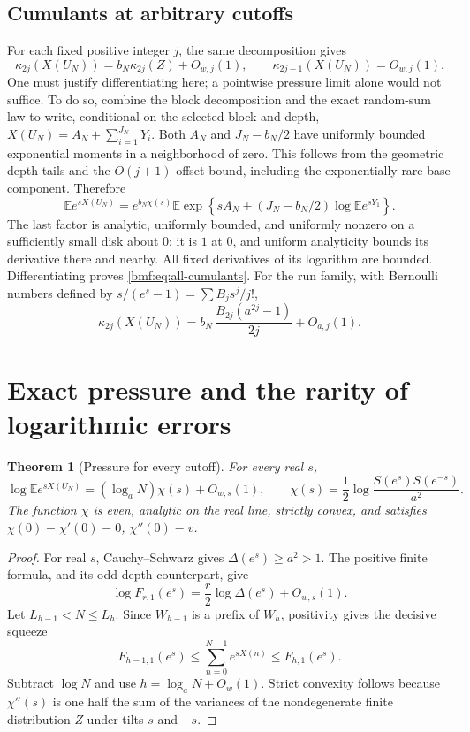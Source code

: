 \documentclass[11pt]{article}
\numberwithin{equation}{section}
\newtheorem{theorem}{Theorem}[section]
\theoremstyle{definition}
\theoremstyle{remark}
\newcommand{\E}{\mathbb E}
\begin{document}
\subsection{Cumulants at arbitrary cutoffs}

For each fixed positive integer $j$, the same decomposition gives
\begin{equation}\label{bmf:eq:all-cumulants}
 \kappa_{2j}(X(U_N))=b_N\kappa_{2j}(Z)+O_{w,j}(1),
 \qquad
 \kappa_{2j-1}(X(U_N))=O_{w,j}(1).
\end{equation}
One must justify differentiating here; a pointwise pressure limit
alone would not suffice. To do so, combine the block decomposition
and the exact random-sum law to write, conditional on the selected
block and depth,
$X(U_N)=A_N+\sum_{i=1}^{J_N}Y_i$. Both $A_N$ and
$J_N-b_N/2$ have uniformly bounded exponential moments in
a neighborhood of zero. This follows from the geometric depth
tails and the $O(j+1)$ offset bound, including the exponentially
rare base component. Therefore
\[
 \E e^{sX(U_N)}
 =e^{b_N\chi(s)}
 \E\exp\left\{sA_N+
       (J_N-b_N/2)\log\E e^{sY_1}\right\}.
\]
The last factor is analytic, uniformly bounded, and uniformly
nonzero on a sufficiently small disk about $0$; it is $1$ at $0$,
and uniform analyticity bounds its derivative there and nearby.
All fixed derivatives of its logarithm are bounded. Differentiating
proves \eqref{bmf:eq:all-cumulants}.
For the run family, with Bernoulli numbers defined by
$s/(e^s-1)=\sum B_j s^j/j!$,
\begin{equation}\label{bmf:eq:bernoulli-cumulants}
 \kappa_{2j}(X(U_N))
 =b_N\,\frac{B_{2j}(a^{2j}-1)}{2j}+O_{a,j}(1).
\end{equation}

\section{Exact pressure and the rarity of logarithmic errors}\label{bmf:sec:pressure}

\begin{theorem}[Pressure for every cutoff]\label{bmf:thm:pressure}
For every real $s$,
\begin{equation}\label{bmf:eq:pressure-asym}
 \log\E e^{sX(U_N)}
 =(\log_a N)\chi(s)+O_{w,s}(1),
 \qquad
 \chi(s)=\frac12\log\frac{S(e^s)S(e^{-s})}{a^2}.
\end{equation}
The function $\chi$ is even, analytic on the real line, strictly
convex, and satisfies $\chi(0)=\chi'(0)=0$, $\chi''(0)=v$.
\end{theorem}
\begin{proof}
For real $s$, Cauchy--Schwarz gives
$\Delta(e^s)\geq a^2>1$. The positive finite formula, and its
odd-depth counterpart, give
\[
 \log F_{r,1}(e^s)=\frac r2\log\Delta(e^s)+O_{w,s}(1).
\]
Let $L_{h-1}<N\leq L_h$. Since $W_{h-1}$ is a prefix of $W_h$,
positivity gives the decisive squeeze
\[
 F_{h-1,1}(e^s)
 \leq \sum_{n=0}^{N-1}e^{sX(n)}
 \leq F_{h,1}(e^s).
\]
Subtract $\log N$ and use $h=\log_a N+O_w(1)$.
Strict convexity follows because
$\chi''(s)$ is one half the sum of the variances of the
nondegenerate finite distribution $Z$ under tilts $s$ and $-s$.
\end{proof}
\end{document}
